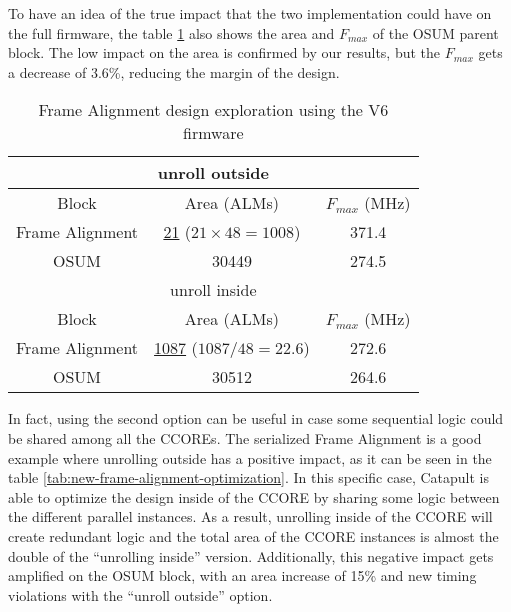 To have an idea of the true impact that the two implementation could have on the full firmware, the table \ref{tab:frame-alignment-optimization} also shows the area and \(F_{max}\) of the OSUM parent block. The low impact on the area is confirmed by our results, but the \(F_{max}\) gets a decrease of 3.6\%, reducing the margin of the design.

\begin{table}[ht]
    \centering
    \begin{tabular}{|c|c|c|}
        \hline
        \hline
        \multicolumn{3}{|c|}{unroll outside} \\
        \hline
        Block & Area (ALMs) & \(F_{max}\) (MHz) \\
        \hline
        Frame Alignment & \underline{21} (\(21\times48=1008\)) & 371.4 \\
        OSUM & 30449 & 274.5 \\
        \hline
        \hline
        \multicolumn{3}{|c|}{unroll inside} \\
        \hline
        Block & Area (ALMs) & \(F_{max}\) (MHz) \\
        \hline
        Frame Alignment & \underline{1087} (\(1087/48=22.6\))& 272.6\\
        OSUM & 30512 & 264.6\\
        \hline
    \end{tabular}
    \caption{Frame Alignment design exploration using the V6 firmware}
    \label{tab:frame-alignment-optimization}
\end{table}

In fact, using the second option can be useful in case some sequential logic could be shared among all the CCOREs. The serialized Frame Alignment is a good example where unrolling outside has a positive impact, as it can be seen in the table \ref{tab:new-frame-alignment-optimization}. In this specific case, Catapult is able to optimize the design inside of the CCORE by sharing some logic between the different parallel instances. As a result, unrolling inside of the CCORE will create redundant logic and the total area of the CCORE instances is almost the double of the ``unrolling inside'' version. Additionally, this negative impact gets amplified on the OSUM block, with an area increase of 15\% and new timing violations with the ``unroll outside'' option.

